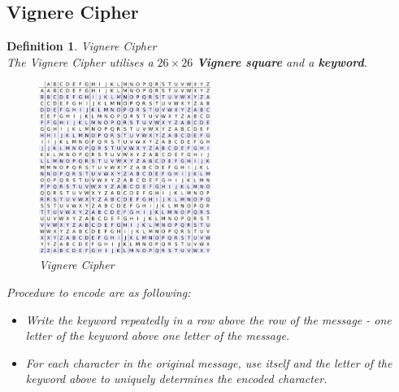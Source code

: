 \documentclass[12pt]{article}
\newtheorem{definition}{Definition}[section]
\theoremstyle{definition}
\begin{document}
\subsection{Vignere Cipher}
\begin{definition}{Vignere Cipher}\hfill\\\normalfont The Vignere Cipher utilises a $26\times 26$ \textbf{Vignere square} and a \textbf{keyword}. \\
\begin{figure}
\centering
\includegraphics[width = 0.5\textwidth]{5_1.png}
\caption{Vignere Cipher}
\end{figure}
Procedure to encode are as following:\\
\begin{itemize}
  \item Write the keyword repeatedly in a row above the row of the message - one letter of the keyword above one letter of the message. 
  \item For each character in the original message, use itself and the letter of the keyword above to uniquely determines the encoded character.
\end{itemize}
\end{definition}
\end{document}
